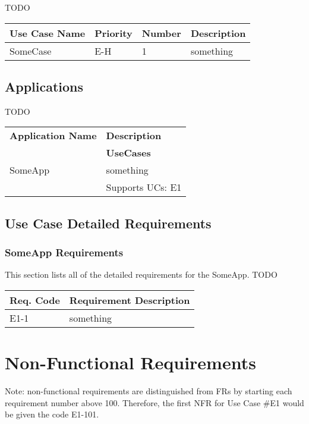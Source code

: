 \documentclass[12pt]{article}
\begin{document}
TODO

\begin{table}[!h]
	\begin{tabular}{| l | l | l | l |}
		\hline
		\textbf{Use Case Name} & \textbf{Priority} & \textbf{Number} & \textbf{Description}\\
		\hline
		SomeCase	& E-H & 1 & something\\
		\hline
	\end{tabular}
	\label{tab:UseCases}
\end{table}

\subsection{Applications}

TODO

\begin{table}[!h]
	\begin{tabular}{| l | l |}
		\hline
		\textbf{Application Name} & \textbf{Description}\\ \cline{2-1}
															& \textbf{UseCases}\\
		\hline
		SomeApp	& something\\ \cline{2-1}
						& Supports UCs: E1\\
		\hline
	\end{tabular}
	\label{tab:Applications}
\end{table}

\subsection{Use Case Detailed Requirements}

\subsubsection{SomeApp Requirements}
This section lists all of the detailed requirements for the SomeApp.
TODO

\begin{table}[!h]
	\begin{tabular}{| l | l |}
	 	\hline
		\textbf{Req. Code} & \textbf{Requirement Description}\\
		\hline
		E1-1	& something\\
		\hline
	\end{tabular}
	\label{tab:SomeAppRequirements}
\end{table}


\section{Non-Functional Requirements}
Note: non-functional requirements are distinguished from FRs by starting each requirement number above 100. Therefore, the first 
NFR for Use Case \#E1 would be given the code E1-101.
\end{document}
